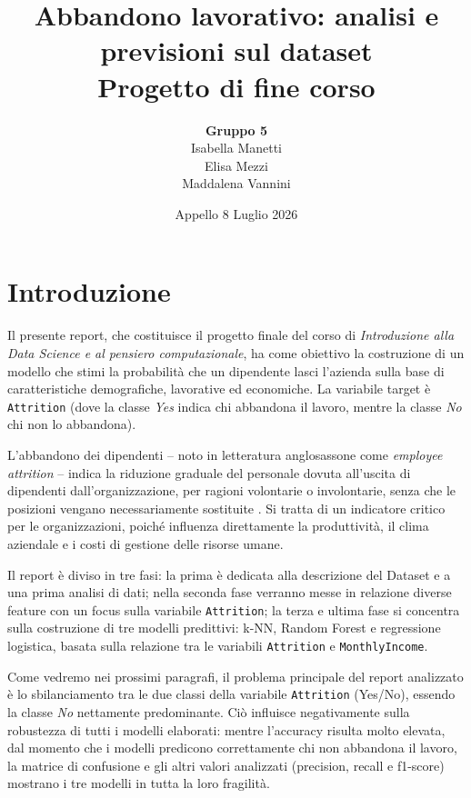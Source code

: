 \documentclass[12pt, a4paper]{article}
\title{\textbf{Abbandono lavorativo: analisi e previsioni sul dataset}\\ 
\large Progetto di fine corso }
\author{\textbf{Gruppo 5} \\ Isabella Manetti \\ Elisa Mezzi \\ Maddalena Vannini }
\date{Appello 8 Luglio 2026}
\begin{document}
 
\maketitle
 
\section{Introduzione}
 
Il presente report, che costituisce il progetto finale del corso di \textit{Introduzione alla Data Science e al pensiero computazionale}, ha come obiettivo la costruzione di un modello che stimi la probabilità che un dipendente lasci l'azienda sulla base di caratteristiche demografiche, lavorative ed economiche. 
La variabile target è \texttt{Attrition} (dove la classe \textit{Yes} indica chi abbandona il lavoro, mentre la classe \textit{No} chi non lo abbandona). 
 
L'abbandono dei dipendenti -- noto in letteratura anglosassone come \textit{employee attrition} -- indica la riduzione graduale del personale dovuta all'uscita di dipendenti dall'organizzazione, per ragioni volontarie o involontarie, senza che le posizioni vengano necessariamente sostituite \cite{aihr2026}. Si tratta di un indicatore critico per le organizzazioni, poiché influenza direttamente la produttività, il clima aziendale e i costi di gestione delle risorse umane.

Il report è diviso in tre fasi: la prima è dedicata alla descrizione del Dataset e a una prima analisi di dati; nella seconda fase verranno messe in relazione diverse feature con un focus sulla variabile \texttt{Attrition}; la terza e ultima fase si concentra sulla costruzione di tre modelli predittivi: k-NN, Random Forest e regressione logistica, basata sulla relazione tra le variabili \texttt{Attrition} e \texttt{MonthlyIncome}.

Come vedremo nei prossimi paragrafi, il problema principale del report analizzato è lo sbilanciamento tra le due classi della variabile \texttt{Attrition} (Yes/No), essendo la classe \textit{No} nettamente predominante. Ciò influisce negativamente sulla robustezza di tutti i modelli elaborati: mentre l'accuracy risulta molto elevata, dal momento che i modelli predicono correttamente chi non abbandona il lavoro, la matrice di confusione e gli altri valori analizzati (precision, recall e f1-score) mostrano i tre modelli in tutta la loro fragilità.
 
\end{document}
